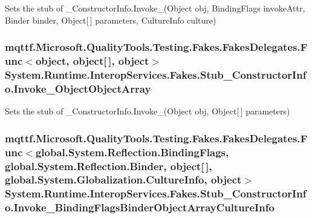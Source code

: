 Sets the stub of \-\_\-\-Constructor\-Info.\-Invoke\-\_(\-Object obj, Binding\-Flags invoke\-Attr, Binder binder, Object\mbox{[}$\,$\mbox{]} parameters, Culture\-Info culture)

\hypertarget{class_system_1_1_runtime_1_1_interop_services_1_1_fakes_1_1_stub___constructor_info_ac544eee85a761dd5d1a14f10b55426eb}{
\subsubsection[{Invoke\-\_\-3\-Object\-Object\-Array}]{\setlength{\rightskip}{0pt plus 5cm}mqttf.\-Microsoft.\-Quality\-Tools.\-Testing.\-Fakes.\-Fakes\-Delegates.\-Func$<$object, object\mbox{[}$\,$\mbox{]}, object$>$ System.\-Runtime.\-Interop\-Services.\-Fakes.\-Stub\-\_\-\-Constructor\-Info.\-Invoke\-\_\-Object\-Object\-Array}}\label{class_system_1_1_runtime_1_1_interop_services_1_1_fakes_1_1_stub___constructor_info_ac544eee85a761dd5d1a14f10b55426eb}


Sets the stub of \-\_\-\-Constructor\-Info.\-Invoke\-\_(\-Object obj, Object\mbox{[}$\,$\mbox{]} parameters)

\hypertarget{class_system_1_1_runtime_1_1_interop_services_1_1_fakes_1_1_stub___constructor_info_abcdf89e2404c09c59ef1f993732856cf}{
\subsubsection[{Invoke\-\_\-4\-Binding\-Flags\-Binder\-Object\-Array\-Culture\-Info}]{\setlength{\rightskip}{0pt plus 5cm}mqttf.\-Microsoft.\-Quality\-Tools.\-Testing.\-Fakes.\-Fakes\-Delegates.\-Func$<$global.\-System.\-Reflection.\-Binding\-Flags, global.\-System.\-Reflection.\-Binder, object\mbox{[}$\,$\mbox{]}, global.\-System.\-Globalization.\-Culture\-Info, object$>$ System.\-Runtime.\-Interop\-Services.\-Fakes.\-Stub\-\_\-\-Constructor\-Info.\-Invoke\-\_\-Binding\-Flags\-Binder\-Object\-Array\-Culture\-Info}}\label{class_system_1_1_runtime_1_1_interop_services_1_1_fakes_1_1_stub___constructor_info_abcdf89e2404c09c59ef1f993732856cf}


